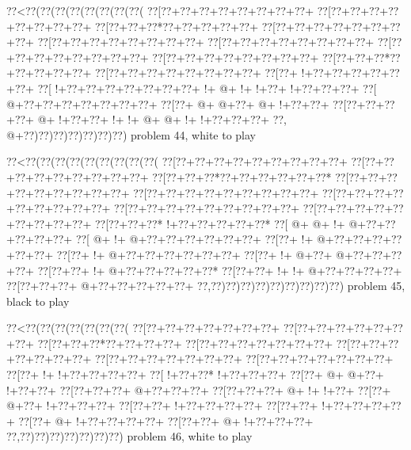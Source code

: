 \vbox{\vbox{\goo
\0??<\0??(\0??(\0??(\0??(\0??(\0??(\0??(\0??(
\0??[\0??+\0??+\0??+\0??+\0??+\0??+\0??+\0??+
\0??[\0??+\0??+\0??+\0??+\0??+\0??+\0??+\0??+
\0??[\0??+\0??+\0??*\0??+\0??+\0??+\0??+\0??+
\0??[\0??+\0??+\0??+\0??+\0??+\0??+\0??+\0??+
\0??[\0??+\0??+\0??+\0??+\0??+\0??+\0??+\0??+
\0??[\0??+\0??+\0??+\0??+\0??+\0??+\0??+\0??+
\0??[\0??+\0??+\0??+\0??+\0??+\0??+\0??+\0??+
\0??[\0??+\0??+\0??+\0??+\0??+\0??+\0??+\0??+
\0??[\0??+\0??+\0??*\0??+\0??+\0??+\0??+\0??+
\0??[\0??+\0??+\0??+\0??+\0??+\0??+\0??+\0??+
\0??[\0??+\- !+\0??+\0??+\0??+\0??+\0??+\0??+
\0??[\- !+\0??+\0??+\0??+\0??+\0??+\0??+\0??+
\- !+\- @+\- !+\- !+\0??+\- !+\0??+\0??+\0??+
\0??[\- @+\0??+\0??+\0??+\0??+\0??+\0??+\0??+
\0??[\0??+\- @+\- @+\0??+\- @+\- !+\0??+\0??+
\0??[\0??+\0??+\0??+\0??+\- @+\- !+\0??+\0??+
\- !+\- !+\- @+\- @+\- !+\- !+\0??+\0??+\0??+
\0??,\- @+\0??)\0??)\0??)\0??)\0??)\0??)\0??)
}
\hfil problem 44, white to play\hfil\break
}

\vbox{\vbox{\goo
\0??<\0??(\0??(\0??(\0??(\0??(\0??(\0??(\0??(\0??(
\0??[\0??+\0??+\0??+\0??+\0??+\0??+\0??+\0??+\0??+
\0??[\0??+\0??+\0??+\0??+\0??+\0??+\0??+\0??+\0??+
\0??[\0??+\0??+\0??*\0??+\0??+\0??+\0??+\0??+\0??*
\0??[\0??+\0??+\0??+\0??+\0??+\0??+\0??+\0??+\0??+
\0??[\0??+\0??+\0??+\0??+\0??+\0??+\0??+\0??+\0??+
\0??[\0??+\0??+\0??+\0??+\0??+\0??+\0??+\0??+\0??+
\0??[\0??+\0??+\0??+\0??+\0??+\0??+\0??+\0??+\0??+
\0??[\0??+\0??+\0??+\0??+\0??+\0??+\0??+\0??+\0??+
\0??[\0??+\0??+\0??*\- !+\0??+\0??+\0??+\0??+\0??*
\0??[\- @+\- @+\- !+\- @+\0??+\0??+\0??+\0??+\0??+
\0??[\- @+\- !+\- @+\0??+\0??+\0??+\0??+\0??+\0??+
\0??[\0??+\- !+\- @+\0??+\0??+\0??+\0??+\0??+\0??+
\0??[\0??+\- !+\- @+\0??+\0??+\0??+\0??+\0??+\0??+
\0??[\0??+\- !+\- @+\0??+\- @+\0??+\0??+\0??+\0??+
\0??[\0??+\0??+\- !+\- @+\0??+\0??+\0??+\0??+\0??*
\0??[\0??+\0??+\- !+\- !+\- @+\0??+\0??+\0??+\0??+
\0??[\0??+\0??+\0??+\- @+\0??+\0??+\0??+\0??+\0??+
\0??,\0??)\0??)\0??)\0??)\0??)\0??)\0??)\0??)\0??)
}
\hfil problem 45, black to play\hfil\break
}

\vbox{\vbox{\goo
\0??<\0??(\0??(\0??(\0??(\0??(\0??(\0??(
\0??[\0??+\0??+\0??+\0??+\0??+\0??+\0??+
\0??[\0??+\0??+\0??+\0??+\0??+\0??+\0??+
\0??[\0??+\0??+\0??*\0??+\0??+\0??+\0??+
\0??[\0??+\0??+\0??+\0??+\0??+\0??+\0??+
\0??[\0??+\0??+\0??+\0??+\0??+\0??+\0??+
\0??[\0??+\0??+\0??+\0??+\0??+\0??+\0??+
\0??[\0??+\0??+\0??+\0??+\0??+\0??+\0??+
\0??[\0??+\- !+\- !+\0??+\0??+\0??+\0??+
\0??[\- !+\0??+\0??*\- !+\0??+\0??+\0??+
\0??[\0??+\- @+\- @+\0??+\- !+\0??+\0??+
\0??[\0??+\0??+\0??+\- @+\0??+\0??+\0??+
\0??[\0??+\0??+\0??+\- @+\- !+\- !+\0??+
\0??[\0??+\- @+\0??+\- !+\0??+\0??+\0??+
\0??[\0??+\0??+\- !+\0??+\0??+\0??+\0??+
\0??[\0??+\0??+\- !+\0??+\0??+\0??+\0??+
\0??[\0??+\- @+\- !+\0??+\0??+\0??+\0??+
\0??[\0??+\0??+\- @+\- !+\0??+\0??+\0??+
\0??,\0??)\0??)\0??)\0??)\0??)\0??)\0??)
}
\hfil problem 46, white to play\hfil\break
}

